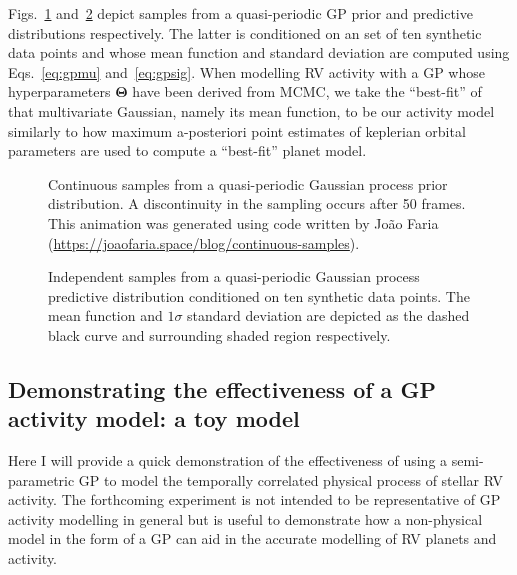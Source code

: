 Figs.~\ref{fig:gpsamples} and~\ref{fig:gpsamplespred} depict samples from a
quasi-periodic GP prior and predictive distributions respectively. The latter is
conditioned on an set of ten synthetic data points and whose mean function and
standard deviation are computed using Eqs.~\ref{eq:gpmu} and~\ref{eq:gpsig}. When
modelling RV activity with a GP whose hyperparameters $\boldsymbol{\Theta}$ have
been derived from MCMC, we take the ``best-fit'' of that multivariate Gaussian, namely
its mean function, to be our activity model similarly to how maximum a-posteriori
point estimates of keplerian orbital parameters are used to compute a ``best-fit''
planet model. \\

\begin{figure}
  \centering
  \caption[Samples from a quasi-periodic Gaussian process prior distribution.]
          {Continuous samples from a quasi-periodic Gaussian process prior distribution.
            A discontinuity in the sampling occurs after 50 frames. This animation was
            generated using code written by Jo\~ao
            Faria (\url{https://joaofaria.space/blog/continuous-samples}).}
  \label{fig:gpsamples}
\end{figure}

\begin{figure}
  \centering
  \caption[Samples from a quasi-periodic Gaussian process predictive distribution.]
          {Independent samples from a quasi-periodic Gaussian process predictive distribution
            conditioned on ten synthetic data points. The mean function and
            $1\sigma$ standard deviation are depicted as the dashed black curve and surrounding
          shaded region respectively.}
  \label{fig:gpsamplespred}
\end{figure}


\subsection{Demonstrating the effectiveness of a GP activity model: a toy model}
Here I will provide a quick demonstration of the effectiveness of using a semi-parametric GP
to model the temporally correlated physical process of stellar RV activity. The forthcoming
experiment is not intended to be representative of GP activity modelling in general but is
useful to demonstrate how a non-physical model in the form of a GP can aid in the accurate 
modelling of RV planets and activity. \\

